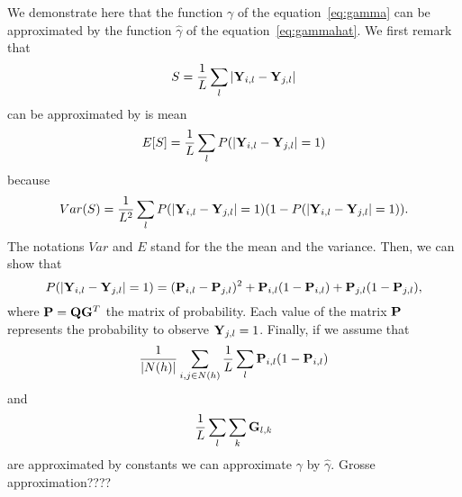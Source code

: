 We demonstrate here that the function $\gamma$ of the equation~\eqref{eq:gamma} can be approximated by the function $\hat{\gamma}$ of the equation~\eqref{eq:gammahat}. We first remark that
$$
S = \frac{1}{L} \sum_l |{\bf Y}_{i,l} - {\bf Y}_{j,l}|
$$
can be approximated by is mean 
$$
E[S] = \frac{1}{L} \sum_l P(|{\bf Y}_{i,l} - {\bf Y}_{j,l}| = 1)
$$
because 
$$
Var(S) = \frac{1}{L^2} \sum_l P(|{\bf Y}_{i,l} - {\bf Y}_{j,l}| = 1) 
( 1 - P(|{\bf Y}_{i,l} - {\bf Y}_{j,l}| = 1)).
$$
The notations $Var$ and $E$ stand for the the mean and the variance. Then, we can show that 
$$
P(|{\bf Y}_{i,l} - {\bf Y}_{j,l}| = 1) = ({\bf P}_{i,l} - {\bf P}_{j,l})^2 + {\bf P}_{i,l} (1 - {\bf P}_{i,l}) + {\bf P}_{j,l} (1 - {\bf P}_{j,l}),
$$
\noindent where ${\bf P} = {\bf Q} {\bf G}^T$ the matrix of probability. Each value of the matrix ${\bf P}$ represents the probability to observe ${\bf Y}_{j,l} = 1$. Finally, if we assume that 
$$
\frac{1}{|N(h)|} \sum_{i,j \in N(h)} \frac{1}{L} \sum_l  {\bf P}_{i,l} (1 - {\bf P}_{i,l})
$$
and 
$$
\frac{1}{L} \sum_l \sum_k {\bf G}_{l,k}
$$
are approximated by constants we can approximate $\gamma$ by $\hat{\gamma}$. 
Grosse approximation????
